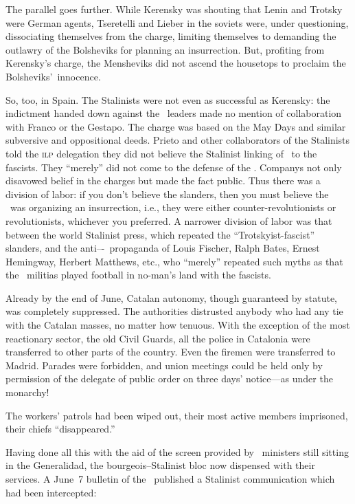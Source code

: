The parallel goes further. While Kerensky was shouting that Lenin and Trotsky were German agents, Tseretelli and Lieber in the soviets were, under questioning, dissociating themselves from the charge, limiting themselves to demanding the outlawry of the Bolsheviks for planning an insurrection. But, profiting from Kerensky’s charge, the Mensheviks did not ascend the housetops to proclaim the Bolsheviks’~innocence.

So, too, in Spain. The Stalinists were not even as successful as Kerensky: the indictment handed down against the \POUM\ leaders made no mention of collaboration with Franco or the Gestapo. The charge was based on the May Days and similar subversive and oppositional deeds. Prieto and other collaborators of the Stalinists told the \textsc{ilp} delegation they did not believe the Stalinist linking of \POUM\ to the fascists. They ``merely'' did not come to the defense of the \POUM. Companys not only disavowed belief in the charges but made the fact public. Thus there was a division of labor: if you don’t believe the slanders, then you must believe the \POUM\ was organizing an insurrection, i.e., they were either counter-revolutionists or revolutionists, whichever you preferred. A narrower division of labor was that between the world Stalinist press, which repeated the ``Trotskyist-fascist'' slanders, and the anti--\POUM-\CNT\ propaganda of Louis Fischer,{\indexLFischer} Ralph Bates, Ernest Hemingway, Herbert Matthews, etc., who ``merely'' repeated such myths as that the \POUM\ militias played football in no-man’s land with the fascists.

\dinkus

Already by the end of June, Catalan autonomy, though guaranteed by statute, was completely suppressed. The authorities distrusted anybody who had any tie with the Catalan masses, no matter how tenuous. With the exception of the most reactionary sector, the old Civil Guards, all the police in Catalonia were transferred to other parts of the country. Even the firemen were transferred to Madrid. Parades were forbidden, and union meetings could be held only by permission of the delegate of public order on three days’ notice---as under the monarchy!

The workers’ patrols had been wiped out, their most active members imprisoned, their chiefs ``disappeared.''

Having done all this with the aid of the screen provided by \CNT\ ministers still sitting in the Generalidad, the bourgeois--Stalinist bloc now dispensed with their services.
A June~7 bulletin of the \FAI\ published a Stalinist communication which had been intercepted:\indexCNT

